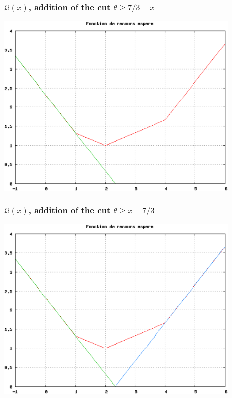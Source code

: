 \documentclass{beamer}
\begin{document}
\begin{frame}
	\frametitle{$\mathcal{Q}(x)$, addition of the cut $\theta \geq 7/3-x$}
	
	\includegraphics[width=0.9\textwidth]{coupe_1.eps}
	
\end{frame}

\begin{frame}
	\frametitle{$\mathcal{Q}(x)$, addition of the cut $\theta \geq x-7/3$}
	
	\includegraphics[width=0.9\textwidth]{coupe_2.eps}
	
\end{frame}
\end{document}

